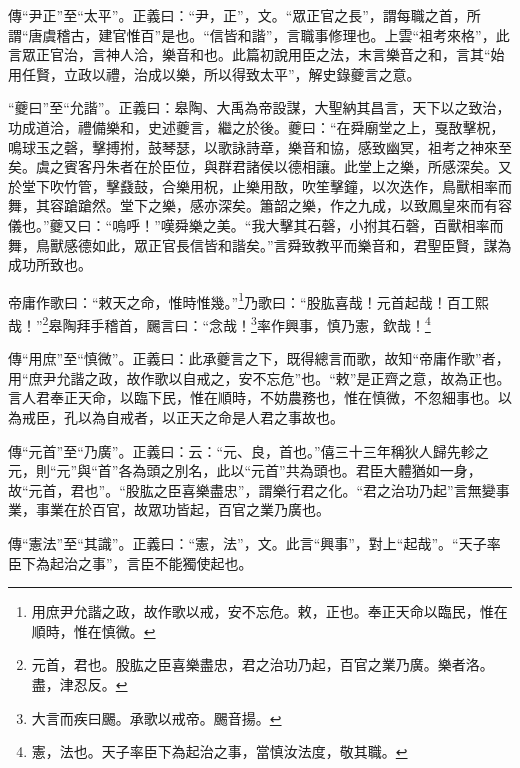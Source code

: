{\noindent\zhuan{}\fzbyks 傳“尹正”至“太平”。正義曰：“尹，正”，文。“眾正官之長”，謂每職之首，所謂“唐虞稽古，建官惟百”是也。“信皆和諧”，言職事修理也。上雲“祖考來格”，此言眾正官治，言神人洽，樂音和也。此篇初說用臣之法，末言樂音之和，言其“始用任賢，立政以禮，治成以樂，所以得致太平”，解史錄夔言之意。 \par}

{\noindent\shu{}\fzkt “夔曰”至“允諧”。正義曰：皋陶、大禹為帝設謀，大聖納其昌言，天下以之致治，功成道洽，禮備樂和，史述夔言，繼之於後。夔曰：“在舜廟堂之上，戛敔擊柷，鳴球玉之磬，擊搏拊，鼓琴瑟，以歌詠詩章，樂音和協，感致幽冥，祖考之神來至矣。虞之賓客丹朱者在於臣位，與群君諸侯以德相讓。此堂上之樂，所感深矣。又於堂下吹竹管，擊鼗鼓，合樂用柷，止樂用敔，吹笙擊鐘，以次迭作，鳥獸相率而舞，其容蹌蹌然。堂下之樂，感亦深矣。簫韶之樂，作之九成，以致鳳皇來而有容儀也。”夔又曰：“嗚呼！”嘆舜樂之美。“我大擊其石磬，小拊其石磬，百獸相率而舞，鳥獸感德如此，眾正官長信皆和諧矣。”言舜致教平而樂音和，君聖臣賢，謀為成功所致也。 \par}

帝庸作歌曰：“敕天之命，惟時惟幾。”\footnote{用庶尹允諧之政，故作歌以戒，安不忘危。敕，正也。奉正天命以臨民，惟在順時，惟在慎微。}乃歌曰：“股肱喜哉！元首起哉！百工熙哉！”\footnote{元首，君也。股肱之臣喜樂盡忠，君之治功乃起，百官之業乃廣。樂者洛。盡，津忍反。}皋陶拜手稽首，颺言曰：“念哉！\footnote{大言而疾曰颺。承歌以戒帝。颺音揚。}率作興事，慎乃憲，欽哉！\footnote{憲，法也。天子率臣下為起治之事，當慎汝法度，敬其職。}


{\noindent\zhuan{}\fzbyks 傳“用庶”至“慎微”。正義曰：此承夔言之下，既得總言而歌，故知“帝庸作歌”者，用“庶尹允諧之政，故作歌以自戒之，安不忘危”也。“敕”是正齊之意，故為正也。言人君奉正天命，以臨下民，惟在順時，不妨農務也，惟在慎微，不忽細事也。以為戒臣，孔以為自戒者，以正天之命是人君之事故也。 \par}

{\noindent\zhuan{}\fzbyks 傳“元首”至“乃廣”。正義曰：云：“元、良，首也。”僖三十三年稱狄人歸先軫之元，則“元”與“首”各為頭之別名，此以“元首”共為頭也。君臣大體猶如一身，故“元首，君也”。“股肱之臣喜樂盡忠”，謂樂行君之化。“君之治功乃起”言無變事業，事業在於百官，故眾功皆起，百官之業乃廣也。 \par}

{\noindent\zhuan{}\fzbyks 傳“憲法”至“其識”。正義曰：“憲，法”，文。此言“興事”，對上“起哉”。“天子率臣下為起治之事”，言臣不能獨使起也。 \par}

